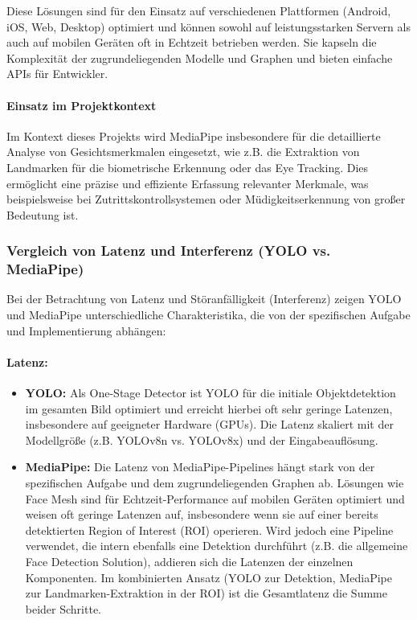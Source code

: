 Diese Lösungen sind für den Einsatz auf verschiedenen Plattformen (Android, iOS, Web, Desktop) optimiert und können sowohl auf leistungsstarken Servern als auch auf mobilen Geräten oft in Echtzeit betrieben werden. Sie kapseln die Komplexität der zugrundeliegenden Modelle und Graphen und bieten einfache APIs für Entwickler.

\paragraph{Einsatz im Projektkontext}
Im Kontext dieses Projekts wird MediaPipe insbesondere für die detaillierte Analyse von Gesichtsmerkmalen eingesetzt, wie z.B. die Extraktion von Landmarken für die biometrische Erkennung oder das Eye Tracking. Dies ermöglicht eine präzise und effiziente Erfassung relevanter Merkmale, was beispielsweise bei Zutrittskontrollsystemen oder Müdigkeitserkennung von großer Bedeutung ist.

\subsubsection{Vergleich von Latenz und Interferenz (YOLO vs. MediaPipe)}
Bei der Betrachtung von Latenz und Störanfälligkeit (Interferenz) zeigen YOLO und MediaPipe unterschiedliche Charakteristika, die von der spezifischen Aufgabe und Implementierung abhängen:

\paragraph{Latenz:}
\begin{itemize}
    \item \textbf{YOLO:} Als One-Stage Detector ist YOLO für die initiale Objektdetektion im gesamten Bild optimiert und erreicht hierbei oft sehr geringe Latenzen, insbesondere auf geeigneter Hardware (GPUs). Die Latenz skaliert mit der Modellgröße (z.B. YOLOv8n vs. YOLOv8x) und der Eingabeauflösung.
    
    \item \textbf{MediaPipe:} Die Latenz von MediaPipe-Pipelines hängt stark von der spezifischen Aufgabe und dem zugrundeliegenden Graphen ab. Lösungen wie Face Mesh sind für Echtzeit-Performance auf mobilen Geräten optimiert und weisen oft geringe Latenzen auf, insbesondere wenn sie auf einer bereits detektierten Region of Interest (ROI) operieren. Wird jedoch eine Pipeline verwendet, die intern ebenfalls eine Detektion durchführt (z.B. die allgemeine Face Detection Solution), addieren sich die Latenzen der einzelnen Komponenten. Im kombinierten Ansatz (YOLO zur Detektion, MediaPipe zur Landmarken-Extraktion in der ROI) ist die Gesamtlatenz die Summe beider Schritte.
\end{itemize}

